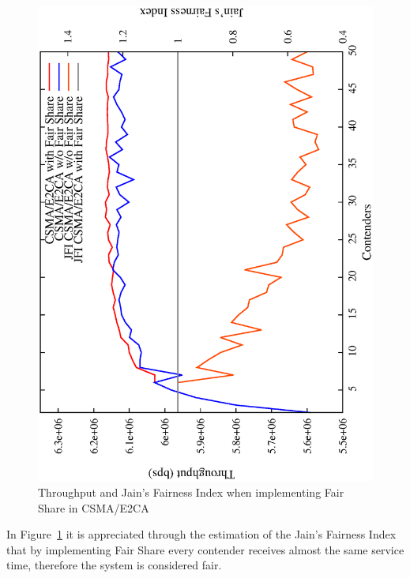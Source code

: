 \begin{figure}[htbp]
  \centering
  \includegraphics[width=0.7\linewidth, angle = -90]{figures/throughput/CSMA-E2CA_w_fairShare.eps}
  \caption{Throughput and Jain's Fairness Index when implementing Fair Share in CSMA/E2CA
  \label{fig:fairShare}}
\end{figure}

In Figure~\ref{fig:fairShare} it is appreciated through the estimation of the Jain's Fairness Index~\cite{JFI} that by implementing Fair Share every contender receives almost the same service time, therefore the system is considered fair.